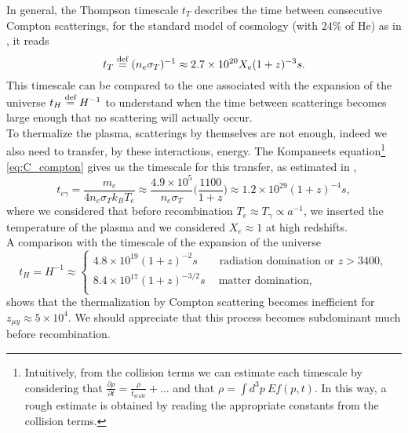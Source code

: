 In general, the Thompson timescale $t_T$ describes the time between consecutive Compton scatterings, for the standard model of cosmology (with $24\%$ of He) as in \cite{chlubafuturestepscosmologyusing}, it reads$$t_T\stackrel{\text{def}}{=}(n_e\sigma_T)^{-1}\approx2.7\times10^{20}X_e(1+z)^{-3}s.$$ This timescale can be compared to the one associated with the expansion of the universe $t_H\stackrel{\text{def}}{=} H^{-1}$
 to understand when the time between scatterings becomes large enough that no scattering will actually occur. \\To thermalize the plasma, scatterings by themselves are not enough, indeed we also need to transfer, by these interactions, energy. The Kompaneets equation\footnote{Intuitively, from the collision terms we can estimate each timescale by considering that $\frac{\partial\rho}{\partial t}=\frac{\rho}{t_\text{scale}}+\dots$ and that $\rho=\int d^3p\ Ef(p,t)$. In this way, a rough estimate is obtained by reading the appropriate constants from the collision terms.} \eqref{eq:C_compton} gives us the timescale for this transfer, as estimated in \cite{chlubafuturestepscosmologyusing},$$ t_{e\gamma}=\frac{m_e}{4n_e\sigma_Tk_BT_e}\approx\frac{4.9\times10^{5}}{n_e\sigma_T}\bigg(\frac{1100}{1+z}\bigg)\approx1.2\times10^{29}(1+z)^{-4}s,$$ 
where we considered that before recombination $T_e\approx T_\gamma\propto a^{-1}$, we inserted the temperature of the plasma and we considered $X_e\approx 1$ at high redshifts.\\ A comparison with the timescale of the expansion of the universe$$t_H=H^{-1}\approx\begin{cases}
    4.8\times10^{19}(1+z)^{-2}s\qquad\text{radiation domination or } z>3400,\\
    8.4\times10^{17}(1+z)^{-3/2}s\quad\ \text{matter domination} ,\\
\end{cases}$$ shows that the thermalization by Compton scattering becomes inefficient for $z_{\mu y}\approx5\times10^4$. We should appreciate that this process becomes subdominant much before recombination.


